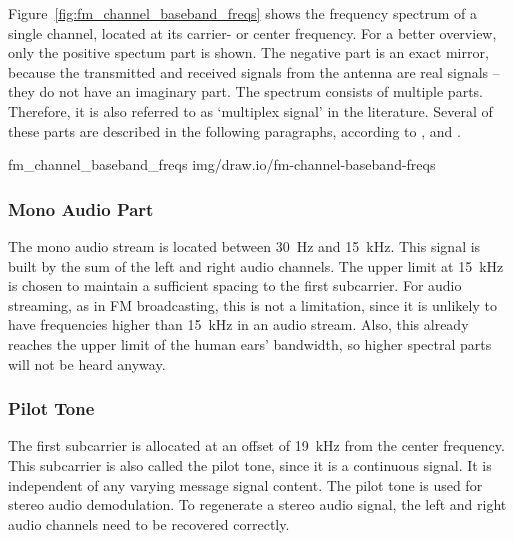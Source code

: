 Figure~\ref{fig:fm_channel_baseband_freqs} shows the frequency spectrum of a single channel, located at its carrier- or center frequency.
For a better overview, only the positive spectum part is shown.
The negative part is an exact mirror, because the transmitted and received signals from the antenna are real signals -- they do not have an imaginary part.
The spectrum consists of multiple parts.
Therefore, it is also referred to as `multiplex signal' in the literature.
Several of these parts are described in the following paragraphs, according to \cite{EbuFmRegulators},\cite{EtsiFmSoundBroadcastingServiceHarmonizedStandard} and \cite{ElectronicsNotesFmTutorial}.

 {fm_channel_baseband_freqs} {img/draw.io/fm-channel-baseband-freqs}

\subsubsection{Mono Audio Part}

The mono audio stream is located between 30~Hz and 15~kHz.
This signal is built by the sum of the left and right audio channels.
The upper limit at 15~kHz is chosen to maintain a sufficient spacing to the first subcarrier.
For audio streaming, as in FM broadcasting, this is not a limitation, since it is unlikely to have frequencies higher than 15~kHz in an audio stream.
Also, this already reaches the upper limit of the human ears' bandwidth, so higher spectral parts will not be heard anyway.

\subsubsection{Pilot Tone}

The first subcarrier is allocated at an offset of 19~kHz from the center frequency.
This subcarrier is also called the pilot tone, since it is a continuous signal.
It is independent of any varying message signal content.
The pilot tone is used for stereo audio demodulation.
To regenerate a stereo audio signal, the left and right audio channels need to be recovered correctly.

